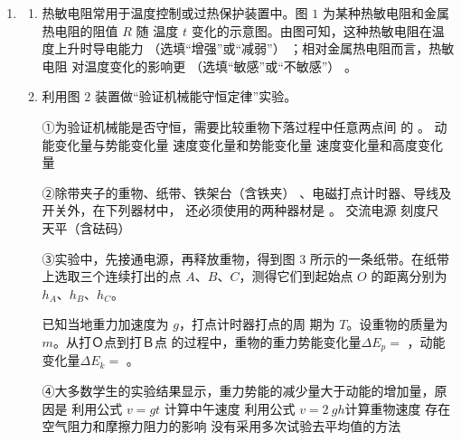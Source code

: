 \begin{enumerate}
\begin{enumerate}
\end{enumerate}



\newpage
\item 
{}
\begin{enumerate}
\renewcommand{\labelenumi}{\arabic{enumi}.}
\item
热敏电阻常用于温度控制或过热保护装置中。图 $ 1 $ 为某种热敏电阻和金属热电阻的阻值 $ R $ 随
温度 $ t $ 变化的示意图。由图可知，这种热敏电阻在温度上升时导电能力
（选填“增强”或“减弱”）
；相对金属热电阻而言，热敏电阻
对温度变化的影响更
（选填“敏感”或“不敏感”）
。
\begin{figure}[h!]
\centering
 \qquad 
  
\end{figure}


\item 
利用图 $ 2 $ 装置做“验证机械能守恒定律”实验。

①为验证机械能是否守恒，需要比较重物下落过程中任意两点间
的  。
\threechoices
{动能变化量与势能变化量}
{速度变化量和势能变化量}
{速度变化量和高度变化量}

②除带夹子的重物、纸带、铁架台（含铁夹）
、电磁打点计时器、导线及开关外，在下列器材中，
还必须使用的两种器材是  。
\threechoices
{交流电源}
{刻度尺}
{天平（含砝码）}

③实验中，先接通电源，再释放重物，得到图 $ 3 $ 所示的一条纸带。在纸带上选取三个连续打出的点
$ A $、$ B $、$ C $，测得它们到起始点 $ O $ 的距离分别为
$ h_{A} $、$ h_{B} $、$ h_{C} $。
\begin{figure}[h!]
\centering

\end{figure}


已知当地重力加速度为 $ g $，打点计时器打点的周
期为 $ T $。设重物的质量为 $ m $。从打Ｏ点到打Ｂ点
的过程中，重物的重力势能变化量$ \Delta E_{p} = $
，动能变化量$ \Delta E_{k} = $
。

④大多数学生的实验结果显示，重力势能的减少量大于动能的增加量，原因是  
\fourchoices
{利用公式 $ v=gt $ 计算中午速度}
{利用公式 $ v=2 \ g h $计算重物速度}
{存在空气阻力和摩擦力阻力的影响}
{没有采用多次试验去平均值的方法}


\end{enumerate}
\end{enumerate}
